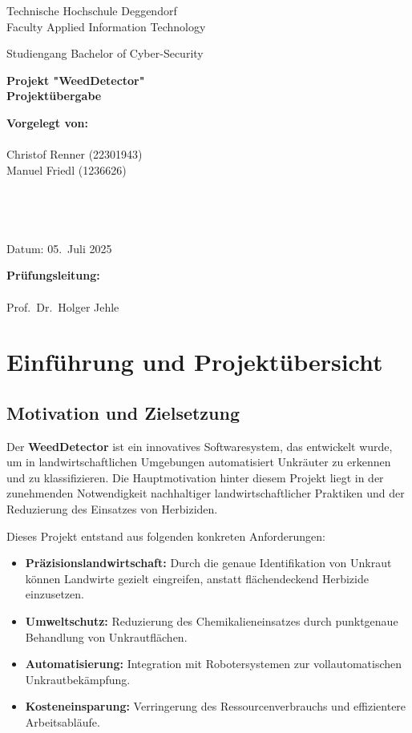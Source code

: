 \documentclass[12pt, a4paper]{scrreprt}
\newcommand{\faculty}{Faculty Applied Information Technology}
\newcommand{\studies}{Bachelor of Cyber-Security}
\newcommand{\thesistitleDE}{Projekt "WeedDetector" \\ Projektübergabe}
\newcommand{\submissiondate}{05.\ Juli 2025}
\newcommand{\supervisor}{Prof.\ Dr.\ Holger Jehle}
\begin{document}
\begin{titlepage}
  \centering
  {\LARGE Technische Hochschule Deggendorf \\ \faculty \par}
  \vspace{0.3cm}
  {\Large Studiengang \studies \\[1.5cm]}
  {\Huge\bfseries \thesistitleDE\par}
  \vfill
  \begin{minipage}[t]{0.45\textwidth}
    \textbf{Vorgelegt von:}\\
    \\
    Christof Renner (22301943)\\
    Manuel Friedl (1236626)\\
    \\
    \\
    \\
    \\
    Datum: \submissiondate
  \end{minipage}\hfill
  \begin{minipage}[t]{0.45\textwidth}
    \textbf{Prüfungsleitung:}\\
    \\
    \supervisor
  \end{minipage}
\end{titlepage}

\tableofcontents
\newpage

\chapter{Einführung und Projektübersicht}

\section{Motivation und Zielsetzung}
Der \textbf{WeedDetector} ist ein innovatives Softwaresystem, das entwickelt wurde, um in landwirtschaftlichen Umgebungen automatisiert Unkräuter zu erkennen und zu klassifizieren. Die Hauptmotivation hinter diesem Projekt liegt in der zunehmenden Notwendigkeit nachhaltiger landwirtschaftlicher Praktiken und der Reduzierung des Einsatzes von Herbiziden.

Dieses Projekt entstand aus folgenden konkreten Anforderungen:
\begin{itemize}
    \item \textbf{Präzisionslandwirtschaft:} Durch die genaue Identifikation von Unkraut können Landwirte gezielt eingreifen, anstatt flächendeckend Herbizide einzusetzen.
    \item \textbf{Umweltschutz:} Reduzierung des Chemikalieneinsatzes durch punktgenaue Behandlung von Unkrautflächen.
    \item \textbf{Automatisierung:} Integration mit Robotersystemen zur vollautomatischen Unkrautbekämpfung.
    \item \textbf{Kosteneinsparung:} Verringerung des Ressourcenverbrauchs und effizientere Arbeitsabläufe.
\end{itemize}
\end{document}
